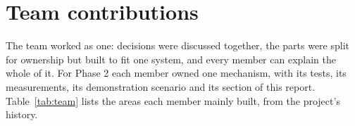 \section{Team contributions}
\label{sec:team}

The team worked as one: decisions were discussed together, the parts were split for ownership but built to fit one system, and every member can explain the whole of it. For Phase 2 each member owned one mechanism, with its tests, its measurements, its demonstration scenario and its section of this report. Table~\ref{tab:team} lists the areas each member mainly built, from the project's history.

